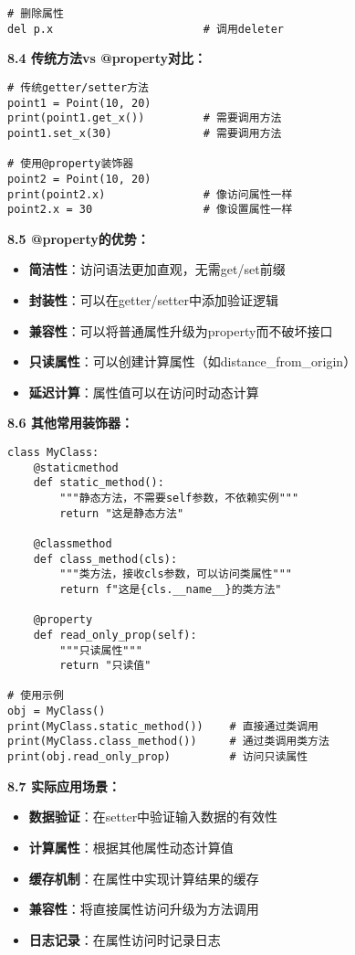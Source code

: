 \begin{mdframed}
\begin{lstlisting}
# 删除属性
del p.x                       # 调用deleter
  \end{lstlisting}

  \textbf{8.4 传统方法vs @property对比：}
  \begin{lstlisting}
# 传统getter/setter方法
point1 = Point(10, 20)
print(point1.get_x())         # 需要调用方法
point1.set_x(30)              # 需要调用方法

# 使用@property装饰器
point2 = Point(10, 20)
print(point2.x)               # 像访问属性一样
point2.x = 30                 # 像设置属性一样
  \end{lstlisting}

  \textbf{8.5 @property的优势：}
  \begin{itemize}
    \item \textbf{简洁性}：访问语法更加直观，无需get/set前缀
    \item \textbf{封装性}：可以在getter/setter中添加验证逻辑
    \item \textbf{兼容性}：可以将普通属性升级为property而不破坏接口
    \item \textbf{只读属性}：可以创建计算属性（如distance\_from\_origin）
    \item \textbf{延迟计算}：属性值可以在访问时动态计算
  \end{itemize}

  \textbf{8.6 其他常用装饰器：}
  \begin{lstlisting}
class MyClass:
    @staticmethod
    def static_method():
        """静态方法，不需要self参数，不依赖实例"""
        return "这是静态方法"

    @classmethod
    def class_method(cls):
        """类方法，接收cls参数，可以访问类属性"""
        return f"这是{cls.__name__}的类方法"

    @property
    def read_only_prop(self):
        """只读属性"""
        return "只读值"

# 使用示例
obj = MyClass()
print(MyClass.static_method())    # 直接通过类调用
print(MyClass.class_method())     # 通过类调用类方法
print(obj.read_only_prop)         # 访问只读属性
  \end{lstlisting}

  \textbf{8.7 实际应用场景：}
  \begin{itemize}
    \item \textbf{数据验证}：在setter中验证输入数据的有效性
    \item \textbf{计算属性}：根据其他属性动态计算值
    \item \textbf{缓存机制}：在属性中实现计算结果的缓存
    \item \textbf{兼容性}：将直接属性访问升级为方法调用
    \item \textbf{日志记录}：在属性访问时记录日志
  \end{itemize}


\end{mdframed}
